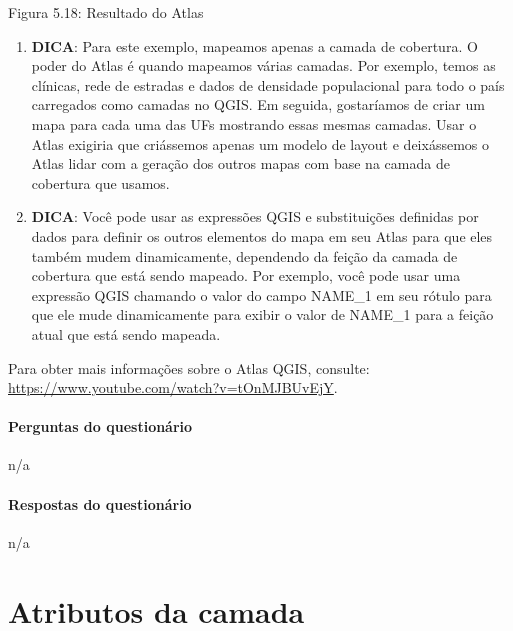 \documentclass[
]{book}
\begin{document}
Figura 5.18: Resultado do Atlas

\begin{enumerate}
\def\labelenumi{\arabic{enumi}.}
\setcounter{enumi}{6}
\item
  \textbf{DICA}: Para este exemplo, mapeamos apenas a camada de cobertura. O poder do Atlas é quando mapeamos várias camadas. Por exemplo, temos as clínicas, rede de estradas e dados de densidade populacional para todo o país carregados como camadas no QGIS. Em seguida, gostaríamos de criar um mapa para cada uma das UFs mostrando essas mesmas camadas. Usar o Atlas exigiria que criássemos apenas um modelo de layout e deixássemos o Atlas lidar com a geração dos outros mapas com base na camada de cobertura que usamos.
\item
  \textbf{DICA}: Você pode usar as expressões QGIS e substituições definidas por dados para definir os outros elementos do mapa em seu Atlas para que eles também mudem dinamicamente, dependendo da feição da camada de cobertura que está sendo mapeado. Por exemplo, você pode usar uma expressão QGIS chamando o valor do campo NAME\_1 em seu rótulo para que ele mude dinamicamente para exibir o valor de NAME\_1 para a feição atual que está sendo mapeada.
\end{enumerate}

Para obter mais informações sobre o Atlas QGIS, consulte: \url{https://www.youtube.com/watch?v=tOnMJBUvEjY}.

\hypertarget{perguntas-do-questionuxe1rio-13}{%
\subsubsection{\texorpdfstring{\textbf{Perguntas do questionário}}{Perguntas do questionário}}\label{perguntas-do-questionuxe1rio-13}}

n/a

\hypertarget{respostas-do-questionuxe1rio-4}{%
\subsubsection{\texorpdfstring{\textbf{Respostas do questionário}}{Respostas do questionário}}\label{respostas-do-questionuxe1rio-4}}

n/a

\hypertarget{atributos-da-camada}{%
\chapter{Atributos da camada}\label{atributos-da-camada}}
\end{document}
